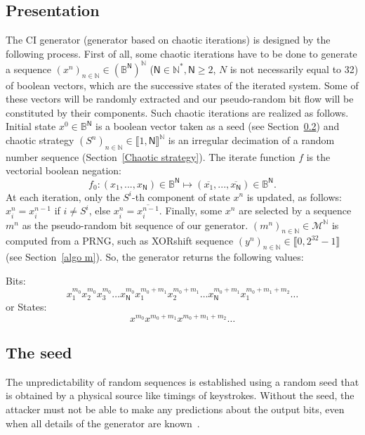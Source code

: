 \subsection{Presentation}
The CI generator (generator based on chaotic iterations) is designed by the following process. First of all, some chaotic iterations have to be done to generate a sequence $\left(x^n\right)_{n\in\mathds{N}} \in \left(\mathds{B}^\mathsf{N}\right)^\mathds{N}$ ($\mathsf{N} \in \mathds{N}^*, \mathsf{N} \geqslant 2$, $N$ is not necessarily equal to 32) of boolean vectors, which are the successive states of the iterated system. Some of these vectors will be randomly extracted and our pseudo-random bit flow will be constituted by their components. Such chaotic iterations are realized as follows. Initial state $x^0 \in \mathds{B}^\mathsf{N}$ is a boolean vector taken as a seed (see Section~\ref{algo seed}) and chaotic strategy $\left(S^n\right)_{n\in\mathds{N}}\in \llbracket 1, \mathsf{N} \rrbracket^\mathds{N}$ is
an irregular decimation of a random number sequence (Section~\ref{Chaotic strategy}). The iterate function $f$ is
the vectorial boolean negation:
$$f_0:(x_1,...,x_\mathsf{N}) \in \mathds{B}^\mathsf{N} \longmapsto (\overline{x_1},...,\overline{x_\mathsf{N}}) \in \mathds{B}^\mathsf{N}.$$
At each iteration, only the $S^i$-th component of state $x^n$ is updated, as follows: $x_i^n = x_i^{n-1}$ if $i \neq S^i$, else $x_i^n = \overline{x_i^{n-1}}$.
Finally, some $x^n$ are selected
by a sequence $m^n$ as the pseudo-random bit sequence of our generator.
$(m^n)_{n \in \mathds{N}} \in \mathcal{M}^\mathds{N}$ is computed from a PRNG, such as XORshift sequence $(y^n)_{n \in \mathds{N}} \in \llbracket 0, 2^{32}-1 \rrbracket$ (see Section~\ref{algo m}). So, the
generator returns the following values:\newline
\begin{small}
Bits:$$x_1^{m_0}x_2^{m_0}x_3^{m_0}\hdots x_\mathsf{N}^{m_0}x_1^{m_0+m_1}x_2^{m_0+m_1}\hdots x_\mathsf{N}^{m_0+m_1} x_1^{m_0+m_1+m_2}\hdots$$
or States:$$x^{m_0}x^{m_0+m_1}x^{m_0+m_1+m_2}\hdots$$
\end{small}


\subsection{The seed}
\label{algo seed}
The unpredictability of random sequences is established using
a random seed that is obtained by a physical source like timings of keystrokes.
Without the seed, the attacker must not be able to make any predictions about
the output bits, even when all details of the generator are known~\cite{Turan2008}.

